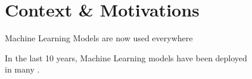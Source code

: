 \section{Context \& Motivations}


\begin{frame}{Machine Learning Models are now used everywhere}

  \begin{minipage}{\textwidth}
    \centering
    In the last 10 years, Machine Learning models have been deployed \\ in many .
  \end{minipage}

  \vspace{0.5cm}


\end{frame}
